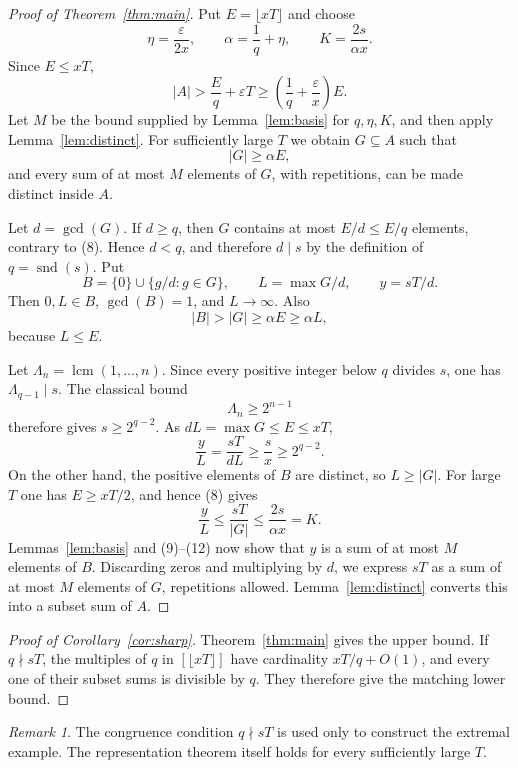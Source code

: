 \documentclass[10pt,reqno]{amsart}
\theoremstyle{remark}
\newtheorem{remark}[theorem]{Remark}
\newcommand{\card}[1]{\lvert #1\rvert}
\newcommand{\lcmop}{\operatorname{lcm}}
\newcommand{\snd}{\operatorname{snd}}
\begin{document}
\begin{proof}[Proof of Theorem~\ref{thm:main}]
Put $E=\lfloor xT\rfloor$ and choose
\[
 \eta=\frac{\varepsilon}{2x},\qquad
 \alpha=\frac1q+\eta,\qquad
 K=\frac{2s}{\alpha x}.
\]
Since $E\leq xT$,
\[
 \card A>\frac Eq+\varepsilon T
 \geq\left(\frac1q+\frac{\varepsilon}{x}\right)E.
\]
Let $M$ be the bound supplied by Lemma~\ref{lem:basis} for $q,\eta,K$, and then apply Lemma~\ref{lem:distinct}.  For sufficiently large $T$ we obtain $G\subseteq A$ such that
\[
 \card G\geq\alpha E, \tag{8}
\]
and every sum of at most $M$ elements of $G$, with repetitions, can be made distinct inside $A$.

Let $d=\gcd(G)$.  If $d\geq q$, then $G$ contains at most $E/d\leq E/q$ elements, contrary to (8).  Hence $d<q$, and therefore $d\mid s$ by the definition of $q=\snd(s)$.
Put
\[
 B=\{0\}\cup\{g/d:g\in G\},
 \qquad
 L=\max G/d,
 \qquad
 y=sT/d.
\]
Then $0,L\in B$, $\gcd(B)=1$, and $L\to\infty$.  Also
\[
 \card B>\card G\geq\alpha E
 \geq\alpha L, \tag{9}
\]
because $L\leq E$.

Let $\Lambda_n=\lcmop(1,\ldots,n)$.  Since every positive integer below $q$ divides $s$, one has $\Lambda_{q-1}\mid s$.  The classical bound~\cite{Farhi}
\[
 \Lambda_n\geq2^{n-1} \tag{10}
\]
therefore gives $s\geq2^{q-2}$.  As $dL=\max G\leq E\leq xT$,
\[
 \frac yL=\frac{sT}{dL}\geq\frac{s}{x}\geq2^{q-2}. \tag{11}
\]
On the other hand, the positive elements of $B$ are distinct, so $L\geq\card G$.  For large $T$ one has $E\geq xT/2$, and hence (8) gives
\[
 \frac yL\leq\frac{sT}{\card G}
 \leq\frac{2s}{\alpha x}=K. \tag{12}
\]
Lemmas~\ref{lem:basis} and (9)--(12) now show that $y$ is a sum of at most $M$ elements of $B$.  Discarding zeros and multiplying by $d$, we express $sT$ as a sum of at most $M$ elements of $G$, repetitions allowed.  Lemma~\ref{lem:distinct} converts this into a subset sum of $A$.
\end{proof}

\begin{proof}[Proof of Corollary~\ref{cor:sharp}]
Theorem~\ref{thm:main} gives the upper bound.  If $q\nmid sT$, the multiples of $q$ in $[\lfloor xT\rfloor]$ have cardinality $xT/q+O(1)$, and every one of their subset sums is divisible by $q$.  They therefore give the matching lower bound.
\end{proof}

\begin{remark}
The congruence condition $q\nmid sT$ is used only to construct the extremal example.  The representation theorem itself holds for every sufficiently large $T$.
\end{remark}
\end{document}
